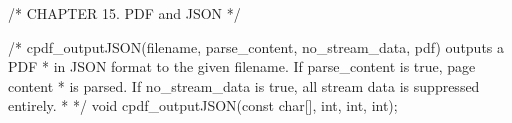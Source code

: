 /* CHAPTER 15. PDF and JSON */

/* cpdf_outputJSON(filename, parse_content, no_stream_data, pdf) outputs a PDF
 * in JSON format to the given filename. If parse_content is true, page content
 * is parsed. If no_stream_data is true, all stream data is suppressed entirely.
 * */
void cpdf_outputJSON(const char[], int, int, int);


